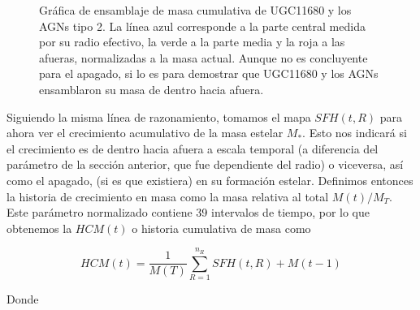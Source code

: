 \begin{figure}[htbp]
\centering
{}
\caption[MGHs para UGC11680 y AGNs]{Gráfica de ensamblaje de masa cumulativa de UGC11680 y los AGNs tipo 2. La línea azul corresponde a la parte central medida por su radio efectivo, la verde a la parte media y la roja a las afueras, normalizadas a la masa actual. Aunque no es concluyente para el apagado, si lo es para demostrar que UGC11680 y los AGNs ensamblaron su masa de dentro hacia afuera.}
\label{ensamblaje_log}
\end{figure}

\bigskip

\noindent Siguiendo la misma línea de razonamiento,  tomamos el mapa $SFH(t,R)$ para ahora ver el crecimiento acumulativo de la masa estelar $M_{*}$. Esto nos indicará si el crecimiento es de dentro hacia afuera a escala temporal (a diferencia del parámetro de la sección anterior, que fue dependiente del radio) o viceversa, así como el apagado, (si es que existiera) en su formación estelar. Definimos entonces la historia de crecimiento en masa como la masa relativa al total $M(t)/M_{T}$. Este parámetro normalizado contiene 39 intervalos de tiempo, por lo que obtenemos la $HCM(t)$ o historia cumulativa de masa como

\begin{equation}
HCM(t)= \frac{1}{M(T)} \sum_{R=1}^{n_R} SFH(t,R) + M(t-1)
\end{equation}

\noindent Donde

